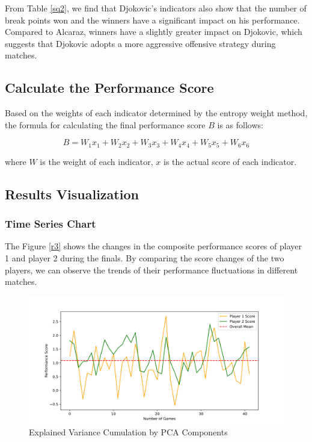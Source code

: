 \documentclass[12pt]{article}%
\begin{document}
From Table \ref{sq2}, we find that Djokovic's indicators also show that the number of break points won and the winners have a significant impact on his performance. Compared to Alcaraz, winners have a slightly greater impact on Djokovic, which suggests that Djokovic adopts a more aggressive offensive strategy during matches.

\subsection{Calculate the Performance Score} 
	
Based on the weights of each indicator determined by the entropy weight method, the formula for calculating the final performance score \( B \) is as follows: 

\begin{equation}
	B=W_{1}x_1+W_{2}x_2+W_{3}x_3+W_{4}x_4+W_{5}x_5+W_{6}x_6
\end{equation}

where \( W \) is the weight of each indicator, \( x \) is the actual score of each indicator.
	

\subsection{Results Visualization}
\subsubsection{Time Series Chart}

The Figure \ref{r3} shows the changes in the composite performance scores of player 1 and player 2 during the finals. By comparing the score changes of the two players, we can observe the trends of their performance fluctuations in different matches.
\begin{figure}[H]
	\centering
	\includegraphics[scale=0.5]{figure//p1r.png}
	\caption{Explained Variance Cumulation by PCA Components}
	\label{p1r}
\end{figure}
\end{document}
